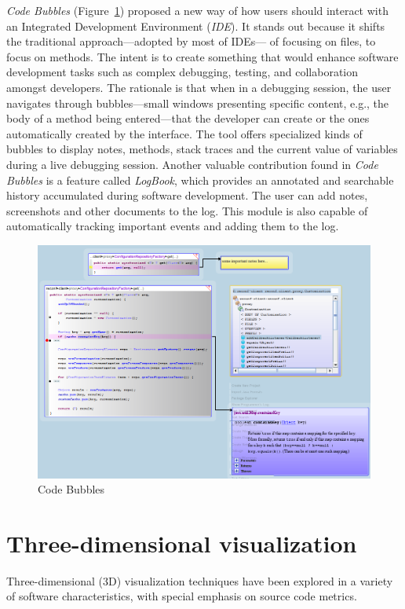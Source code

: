 \textit{Code Bubbles} (Figure~\ref{ss:reiss2012code}) proposed a new way of how
users should interact with an Integrated Development Environment
(\textit{IDE}).
It stands out because it shifts the traditional approach---adopted by most of
IDEs--- of focusing on files, to focus on methods. The intent is to create
something that would enhance software development tasks such as complex
debugging, testing, and collaboration amongst developers. The rationale is that
when in a debugging session, the user navigates through bubbles---small windows
presenting specific content, e.g., the body of a method being entered---that the
developer can create or the ones automatically created by the interface. The
tool offers specialized kinds of bubbles to display notes, methods, stack
traces and the current value of variables during a live debugging session.
Another valuable contribution found in \textit{Code Bubbles} is a feature called
\textit{LogBook}, which provides an annotated and searchable history accumulated
during software development. The user can add notes, screenshots and other
documents to the log.
This module is also capable of automatically tracking important events and
adding them to the log.

\begin{center}
\begin{figure}[H]
\centerline{\includegraphics[width=.6\linewidth]{figures/reiss2012code}}
\caption{Code Bubbles~\cite{reiss2012code}}\label{ss:reiss2012code}
\end{figure}
\end{center}

\section{Three-dimensional visualization}\label{subsec:3dstateofart}

Three-dimensional (3D) visualization techniques have been explored in a
variety of software characteristics, with special emphasis on source code
metrics.

